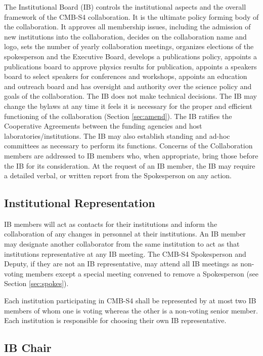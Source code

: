 \documentclass[12pt]{article}
\begin{document}
The Institutional Board (IB) controls the institutional aspects and the overall framework of the CMB-S4 collaboration. It is the ultimate policy forming body of the collaboration. It approves all membership issues, including the admission of new institutions into the collaboration, decides on the collaboration name and logo, sets the number of yearly collaboration meetings, organizes elections of the spokesperson and the Executive Board, develops a publications policy, appoints a publications board to approve physics results for publication, appoints a speakers board to select speakers for conferences and workshops, appoints an education and outreach board and has oversight and authority over the science policy and goals of the collaboration. The IB does not make technical decisions. The IB may change the bylaws at any time it feels it is necessary for the proper and efficient functioning of the collaboration (Section \ref{sec:amend}). The IB ratifies the Cooperative Agreements between the funding agencies and host laboratories/institutions. The IB may also establish standing and ad-hoc committees as necessary to perform its functions. Concerns of the Collaboration members are addressed to IB members who, when appropriate, bring those before the IB for its consideration. At the request of an IB member, the IB may require a detailed verbal, or written report from the Spokesperson on any action.

\subsection{Institutional Representation}

IB members will act as contacts for their institutions and inform the collaboration of any changes in personnel at their institutions. An IB member may designate another collaborator from the same institution to act as that institutions representative at any IB meeting. The CMB-S4 Spokesperson and Deputy, if they are not an IB representative, may attend all IB meetings as non-voting members except a special meeting convened to remove a Spokesperson (see Section \ref{sec:spokes}).

Each institution participating in CMB-S4 shall be represented by at most two IB members of whom one is voting whereas the other is a non-voting senior member. Each institution is responsible for choosing their own IB representative.

\subsection{IB Chair}
\end{document}
